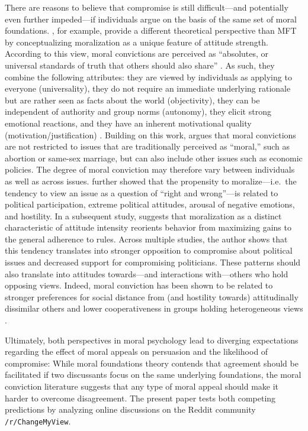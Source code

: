 There are reasons to believe that compromise is still difficult---and potentially even further impeded---if individuals argue on the basis of the same set of moral foundations. \citet{skitka2005moral}, for example, provide a different theoretical perspective than MFT by conceptualizing moralization as a unique feature of attitude strength. According to this view, moral convictions are perceived as ``absolutes, or universal standards of truth that others should also share'' \citep[269]{skitka2010psychology}. As such, they combine the following attributes: they are viewed by individuals as applying to everyone (universality), they do not require an immediate underlying rationale but are rather seen as facts about the world (objectivity), they can be independent of authority and group norms (autonomy), they elicit strong emotional reactions, and they have an inherent motivational quality (motivation/justification) \citep{skitka2010psychology}. Building on this work, \citet{ryan2014reconsidering} argues that moral convictions are not restricted to issues that are traditionally perceived as ``moral,'' such as abortion or same-sex marriage, but can also include other issues such as economic policies. The degree of moral conviction may therefore vary between individuals as well as across issues. \citet{ryan2014reconsidering} further showed that the propensity to moralize---i.e.~the tendency to view an issue as a question of ``right and wrong''---is related to political participation, extreme political attitudes, arousal of negative emotions, and hostility. In a subsequent study, \citet{ryan2016no} suggests that moralization as a distinct characteristic of attitude intensity reorients behavior from maximizing gains to the general adherence to rules. Across multiple studies, the author shows that this tendency translates into stronger opposition to compromise about political issues and decreased support for compromising politicians. These patterns should also translate into attitudes towards---and interactions with---others who hold opposing views. Indeed, moral conviction has been shown to be related to stronger preferences for social distance from (and hostility towards) attitudinally dissimilar others and lower cooperativeness in groups holding heterogeneous views \citep{skitka2005moral}.

Ultimately, both perspectives in moral psychology lead to diverging expectations regarding the effect of moral appeals on persuasion and the likelihood of compromise: While moral foundations theory contends that agreement should be facilitated if two discussants focus on the same underlying foundations, the moral conviction literature suggests that any type of moral appeal should make it harder to overcome disagreement. The present paper tests both competing predictions by analyzing online discussions on the Reddit community \texttt{/r/ChangeMyView}. 


